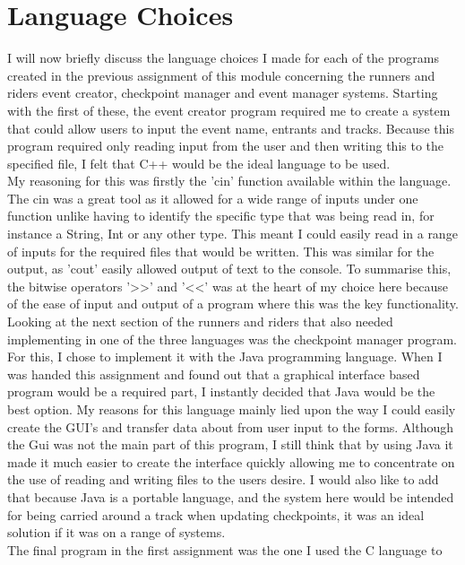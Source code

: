 \documentclass[a4paper]{article}
\begin{document}
\section{Language Choices}
I will now briefly discuss the language choices I made for each of the programs
created in the previous assignment of this module concerning the runners and
riders event creator, checkpoint manager and event manager systems.
Starting with the first of these, the event creator program required me to
create a system that could allow users to input the event name, entrants and
tracks. Because this program required only reading input from the user and then
writing this to the specified file, I felt that C++ would be the ideal language
to be used.
 \\[4mm]
 My reasoning for this was firstly the 'cin' function available within the
language. The cin was a great tool as it allowed for a wide range of inputs
under one function unlike having to identify the specific type that was being
read in, for instance a String, Int or any other type.
This meant I could easily read in a range of inputs for the required files that
would be written. This was similar for the output, as 'cout' easily allowed
output of text to the console.
To summarise this, the bitwise operators '\textgreater\textgreater' and
'\textless\textless' was at the heart of my choice here because of the ease of
input and output of a program where this was the key functionality.
 \\[4mm]
Looking at the next section of the runners and riders that also needed
implementing in one of the three languages was the checkpoint manager program.
For this, I chose to implement it with the Java programming language. 
When I was handed this assignment and found out that a graphical interface based
program would be a required part, I instantly decided that Java would be the
best option. My reasons for this language mainly lied upon the way I could
easily create the GUI's and transfer data about from user input to the forms.
Although the Gui was not the main part of this program, I still think that by
using Java it made it much easier to create the interface quickly allowing me to
concentrate on the use of reading and writing files to the users desire. 
I would also like to add that because Java is a portable language, and the
system here would be intended for being carried around a track when updating
checkpoints, it was an ideal solution if it was on a range of systems.
 \\[4mm]
The final program in the first assignment was the one I used the C language to
\end{document}

